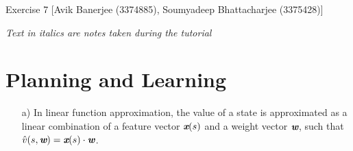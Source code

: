 \documentclass{article}
\begin{document}
\begin{center}
	{\LARGE Exercise 7}\linebreak
	{\large [Avik Banerjee (3374885), Soumyadeep Bhattacharjee (3375428)]}
\end{center}
\textit{Text in italics are notes taken during the tutorial}
\section{Planning and Learning}
\begin{enumerate}
	\item[a)]In linear function approximation, the value of a state is approximated as a linear combination of a feature vector $\textit{\textbf{x}}(s)$ and a weight vector $\textit{\textbf{w}}$, such that $\hat{v}(s,\textit{\textbf{w}}) = \textit{\textbf{x}}(s)\cdot\textit{\textbf{w}}$.
	

\end{enumerate}
\end{document}
